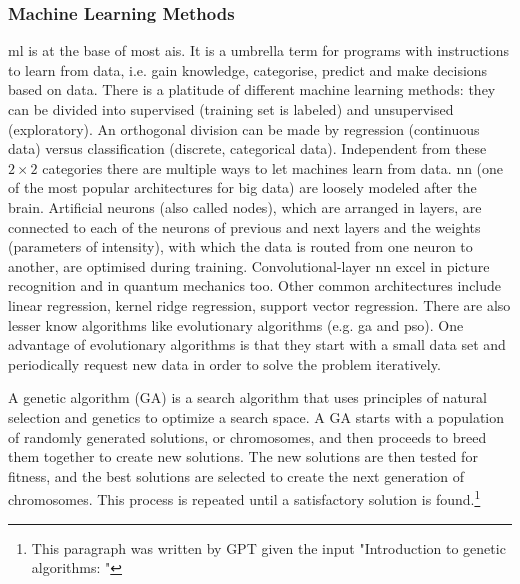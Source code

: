 \subsubsection{Machine Learning Methods}
%
\Gls{ml} is at the base of most \gls{ai}s.
It is a umbrella term for programs with instructions to learn from data, i.e. gain knowledge, categorise, predict and make decisions based on data. 
%
There is a platitude of different machine learning methods: 
they can be divided into supervised (training set is labeled) and unsupervised (exploratory).  
An orthogonal division can be made by regression (continuous data) versus classification (discrete, categorical data). 
Independent from these $2\times2$ categories there are multiple ways to let machines learn from data.
\Gls{nn} (one of the most popular architectures for big data\cite{Chiroma2019}) are loosely modeled after the brain\cite{bishop1994neural}.
%
Artificial neurons (also called nodes), which are arranged in layers, 
are connected to each of the neurons of previous and next layers
and the weights (parameters of intensity), with which the data is routed from one neuron to another, 
are optimised during training. 
%
Convolutional-layer \gls{nn} excel in picture recognition\cite{Lecun1995conv} and in quantum mechanics too\cite{westermayr2020combining}.
Other common architectures include linear regression, kernel ridge regression, support vector regression.
There are also lesser know algorithms like 
evolutionary algorithms (e.g. \gls{ga} and \gls{pso}).
%
One advantage of evolutionary algorithms is that they start with a small data set
and periodically request new data in order to solve the problem iteratively.

A genetic algorithm (GA) is a search algorithm that uses principles of natural selection and genetics to optimize a search space. A GA starts with a population of randomly generated solutions, or chromosomes, and then proceeds to breed them together to create new solutions. The new solutions are then tested for fitness, and the best solutions are selected to create the next generation of chromosomes. This process is repeated until a satisfactory solution is found.\footnote{This paragraph was written by GPT\cite{Liu2021gpt} given the input "Introduction to genetic algorithms: "}

